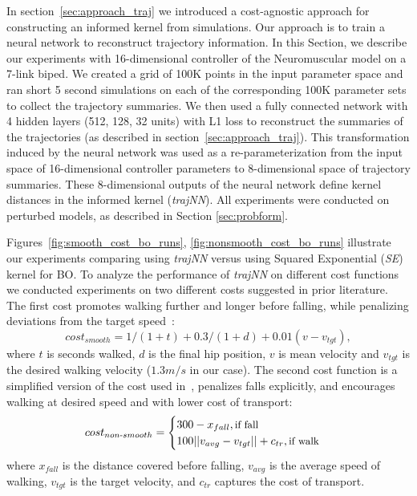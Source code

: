 In section~\ref{sec:approach_traj} we introduced a cost-agnostic approach for constructing an informed kernel from simulations. Our approach is to train a neural network to reconstruct trajectory information. In this Section, we describe our experiments with 16-dimensional controller of the Neuromuscular model on a 7-link biped. We created a grid of 100K points in the input parameter space  and ran short 5 second simulations on each of the corresponding 100K parameter sets to collect the trajectory summaries. We then used a fully connected network with 4 hidden layers (512, 128, 32 units) with L1 loss to reconstruct the summaries of the trajectories (as described in section~\ref{sec:approach_traj}). This transformation induced by the neural network was used as a re-parameterization from the input space of 16-dimensional controller parameters to 8-dimensional space of trajectory summaries. These 8-dimensional outputs of the neural network define kernel distances in the informed kernel (\textit{trajNN}). All experiments were conducted on perturbed models, as described in Section \ref{sec:probform}.

Figures~\ref{fig:smooth_cost_bo_runs}, \ref{fig:nonsmooth_cost_bo_runs} illustrate our experiments comparing using \textit{trajNN} versus using Squared Exponential (\textit{SE}) kernel for BO. To analyze the performance of \textit{trajNN} on different cost functions we conducted experiments on two different costs suggested in prior literature. The first cost promotes walking further and longer before falling, while penalizing deviations from the target speed~\citep{rai2016sample}:
\begin{equation}
cost_{smooth} = 1/(1+t) + 0.3/(1+d) + 0.01(v-v_{tgt}),
\label{eq:cost_smooth}
\end{equation}
where $t$ is seconds walked, $d$ is the final hip position, $v$ is mean velocity and $v_{tgt}$ is the desired walking velocity ($1.3m/s$ in our case). 
The second cost function is a simplified version of the cost used in~\cite{song2015neural}, penalizes falls explicitly, and encourages walking at desired speed and with lower cost of transport:
\begin{equation}
cost_{non\text{-}smooth} = 		
    \begin{cases}
		300 - x_{fall} , \text{\small{if fall}} \\
		100 ||v_{avg} - v_{tgt}|| + c_{tr}, \text{\small{if walk}}\\
	\end{cases}
\label{eq:cost_nonsmooth}
\end{equation}
where $x_{fall}$ is the distance covered before falling, $v_{avg}$ is the average speed of walking, $v_{tgt}$ is the target velocity, and $c_{tr}$ captures the cost of transport.

